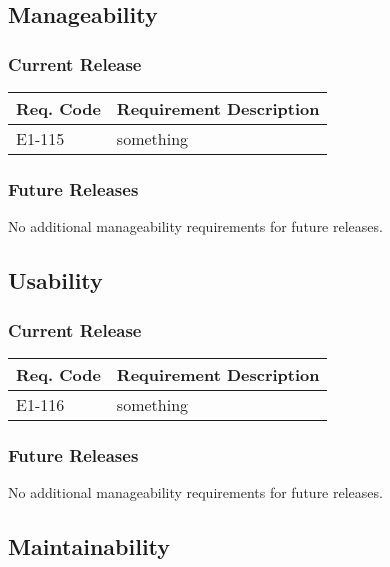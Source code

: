 \documentclass[12pt]{article}
\begin{document}
\subsection{Manageability}

\subsubsection{Current Release}

\begin{table}[!h]
	\begin{tabular}{| l | l |}
		\hline
		\textbf{Req. Code} & \textbf{Requirement Description}\\
		\hline
		E1-115	& something\\
		\hline
	\end{tabular}
	\label{tab:ManageabilityRequirements}
\end{table}

\subsubsection{Future Releases}
No additional manageability requirements for future releases.


\subsection{Usability}

\subsubsection{Current Release}

\begin{table}[!h]
	\begin{tabular}{| l | l |}
		\hline
		\textbf{Req. Code} & \textbf{Requirement Description}\\
		\hline
		E1-116	& something\\
		\hline
	\end{tabular}
	\label{tab:UsabilityRequirements}
\end{table}

\subsubsection{Future Releases}
No additional manageability requirements for future releases.


\subsection{Maintainability}
\end{document}

